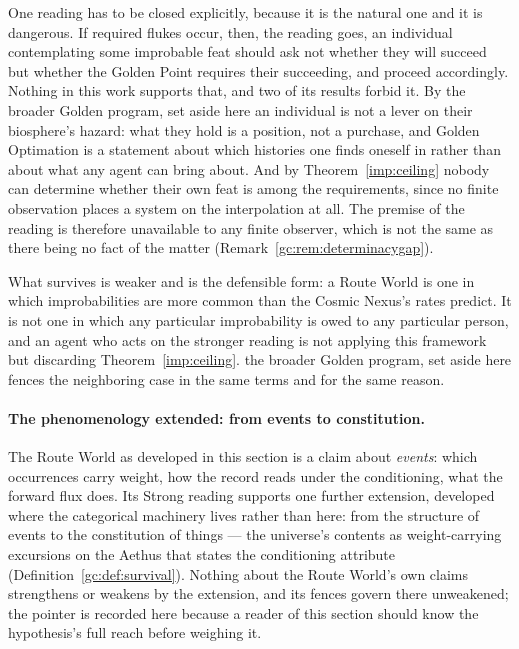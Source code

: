 \begin{remark}
\label{gc:rem:routefence}
One reading has to be closed explicitly, because it is the natural one
and it is dangerous. If required flukes occur, then, the reading goes, an individual
contemplating some improbable feat should ask not whether they will
succeed but whether the Golden Point requires their succeeding, and
proceed accordingly. Nothing in this work supports that, and two of its
results forbid it. By the broader Golden program, set aside here an individual is not a
lever on their biosphere's hazard: what they hold is a position, not a
purchase, and Golden Optimation is a statement about which histories one
finds oneself in rather than about what any agent can bring about. And
by Theorem~\ref{imp:ceiling} nobody can determine whether their own
feat is among the requirements, since no finite observation places a
system on the interpolation at all. The premise of the reading is therefore
unavailable to any finite observer, which is not the same as there being
no fact of the matter (Remark~\ref{gc:rem:determinacygap}).

What survives is weaker and is the defensible form: a Route World is one in
which improbabilities are more common than the Cosmic Nexus's rates
predict. It is not one in which any particular improbability is owed to
any particular person, and an agent who acts on the stronger reading is
not applying this framework but discarding
Theorem~\ref{imp:ceiling}. the broader Golden program, set aside here fences the neighboring
case in the same terms and for the same reason.
\end{remark}

\paragraph{The phenomenology extended: from events to constitution.}\label{gc:rem:constitution}
The Route World as developed in this section is a claim about
\emph{events}: which occurrences carry weight, how the record reads
under the conditioning, what the forward flux does. Its Strong reading
supports one further extension, developed where the categorical
machinery lives rather than here: from the structure of events to the
constitution of things --- the universe's contents as
weight-carrying excursions on the Aethus that states the conditioning
attribute (Definition~\ref{gc:def:survival}). Nothing about the Route
World's own claims strengthens or weakens by the extension, and its
fences govern there unweakened; the pointer is recorded here because a
reader of this section should know the hypothesis's full reach before
weighing it.

